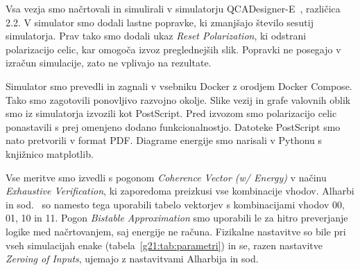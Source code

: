 Vsa vezja smo načrtovali in simulirali v simulatorju QCADesigner-E~\cite{walus2004,silltorres2018}, različica 2.2. V simulator smo dodali lastne popravke, ki zmanjšajo število sesutij simulatorja. Prav tako smo dodali ukaz \emph{Reset Polarization}, ki odstrani polarizacijo celic, kar omogoča izvoz preglednejših slik. Popravki ne posegajo v izračun simulacije, zato ne vplivajo na rezultate.

Simulator smo prevedli in zagnali v vsebniku Docker z orodjem Docker Compose. Tako smo zagotovili ponovljivo razvojno okolje. Slike vezij in grafe valovnih oblik smo iz simulatorja izvozili kot PostScript. Pred izvozom smo polarizacijo celic ponastavili s prej omenjeno dodano funkcionalnostjo. Datoteke PostScript smo nato pretvorili v format PDF. Diagrame energije smo narisali v Pythonu s knjižnico matplotlib.

Vse meritve smo izvedli s pogonom \emph{Coherence Vector (w/ Energy)} v načinu \emph{Exhaustive Verification}, ki zaporedoma preizkusi vse kombinacije vhodov. Alharbi in sod.~\cite{g21:alharbi2022} so namesto tega uporabili tabelo vektorjev s kombinacijami vhodov 00, 01, 10 in 11. Pogon \emph{Bistable Approximation} smo uporabili le za hitro preverjanje logike med načrtovanjem, saj energije ne računa. Fizikalne nastavitve so bile pri vseh simulacijah enake (tabela~\ref{g21:tab:parametri}) in se, razen nastavitve \emph{Zeroing of Inputs}, ujemajo z nastavitvami Alharbija in sod.

